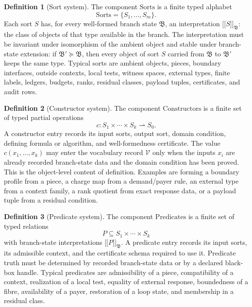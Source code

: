 \documentclass[
  11pt,
]{article}
\providecommand{\llbracket}{\mathopen{[\![}}
\providecommand{\rrbracket}{\mathclose{]\!]}}
\theoremstyle{definition}
\newtheorem{definition}{Definition}[section]
\begin{document}
\begin{definition}[Sort system]\label{def:proof-language-sorts}
The component \(\mathrm{Sorts}\) is a finite typed alphabet
\[
\mathrm{Sorts}=\{S_1,\ldots,S_m\}.
\]
Each sort \(S\) has, for every well-formed branch state
\(\mathfrak B\), an interpretation \(\llbracket S\rrbracket_{\mathfrak B}\):
the class of objects of that type available in the branch.  The
interpretation must be invariant under isomorphism of the ambient object
and stable under branch-state extension: if
\(\mathfrak B'\succeq\mathfrak B\), then every object of sort \(S\)
carried from \(\mathfrak B\) to \(\mathfrak B'\) keeps the same type.
Typical sorts are ambient objects, pieces, boundary interfaces, outside
contexts, local tests, witness spaces, external types, finite labels,
ledgers, budgets, ranks, residual classes, payload tuples, certificates,
and audit rows.
\end{definition}

\begin{definition}[Constructor system]\label{def:proof-language-constructors}
The component \(\mathrm{Constructors}\) is a finite set of typed partial
operations
\[
c:S_1\times\cdots\times S_k\rightharpoonup S_0.
\]
A constructor entry records its input sorts, output sort, domain
condition, defining formula or algorithm, and well-formedness
certificate.  The value \(c(x_1,\ldots,x_k)\) may enter the vocabulary
record \(\mathcal V\) only when the inputs \(x_i\) are already recorded
branch-state data and the domain condition has been proved.  This is the
object-level content of definition.  Examples are forming a boundary profile
from a piece, a charge map from a demand/payer rule, an external type
from a context family, a rank quotient from exact response data, or a
payload tuple from a residual condition.
\end{definition}

\begin{definition}[Predicate system]\label{def:proof-language-predicates}
The component \(\mathrm{Predicates}\) is a finite set of typed relations
\[
P\subseteq S_1\times\cdots\times S_k
\]
with branch-state interpretations
\(\llbracket P\rrbracket_{\mathfrak B}\).  A predicate entry records its
input sorts, its admissible context, and the certificate schema required
to use it.  Predicate truth must be determined by recorded branch-state
data or by a declared black-box handle.  Typical predicates are
admissibility of a piece, compatibility of a context, realization of a
local test, equality of external response, boundedness of a fibre,
availability of a payer, restoration of a loop state, and membership in
a residual class.
\end{definition}
\end{document}
